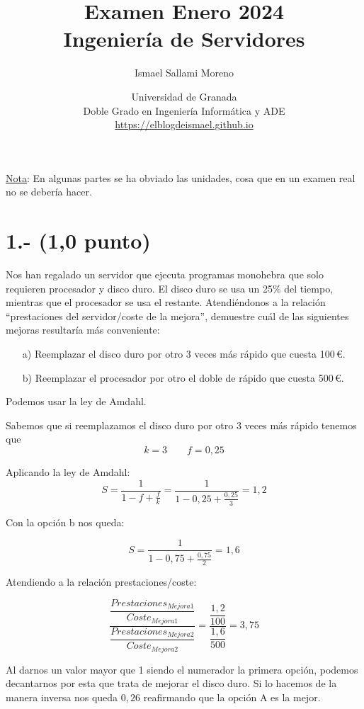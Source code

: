 \documentclass[a4paper,12pt]{article}
\title{\Huge Examen Enero 2024 \vspace{0.5cm} \\ \Large Ingeniería de Servidores}
\author{Ismael Sallami Moreno}
\date{\small Universidad de Granada\\ Doble Grado en Ingeniería Informática y ADE\\ \url{https://elblogdeismael.github.io}}
\begin{document}
\maketitle
\thispagestyle{fancy}

\vspace{1cm}

\underline{Nota}: En algunas partes se ha obviado las unidades, cosa que en  un examen real no se debería hacer. 

\section*{1.- (1,0 punto)}
Nos han regalado un servidor que ejecuta programas monohebra que solo requieren procesador y disco duro. El disco duro se usa un 25\% del tiempo, mientras que el procesador se usa el restante. Atendiéndonos a la relación ``prestaciones del servidor/coste de la mejora'', demuestre cuál de las siguientes mejoras resultaría más conveniente:
\begin{enumerate}
    \item[a)] Reemplazar el disco duro por otro 3 veces más rápido que cuesta 100\,€.
    
    

    \item[b)] Reemplazar el procesador por otro el doble de rápido que cuesta 500\,€.
\end{enumerate}

    Podemos usar la ley de Amdahl.

    Sabemos que si reemplazamos el disco duro por otro 3 veces más rápido tenemos que
    $$
    k=3 \qquad f=0,25
    $$
    
    Aplicando la ley de Amdahl:
    $$
    S = \frac{1}{1-f+\frac{f}{k}} = \frac{1}{1-0,25 + \frac{0,25}{3}} = 1,2
    $$

    Con la opción b nos queda:

    $$
    S = \frac{1}{1-0,75+\frac{0,75}{2}} = 1,6
    $$

    Atendiendo a la relación prestaciones/coste:

    $$
    \frac{\dfrac{Prestaciones_{Mejora1}}{Coste_{Mejora1}}}{\dfrac{Prestaciones_{Mejora2}}{Coste_{Mejora2}}} = \frac{\dfrac{1{,}2}{100}}{\dfrac{1{,}6}{500}} = 3{,}75
    $$ 

    Al darnos un valor mayor que 1 siendo el numerador la primera opción, podemos decantarnos por esta que trata de mejorar el disco duro. Si lo hacemos de la manera inversa nos queda $0,26$ reafirmando que la opción A es la mejor.
\end{document}
